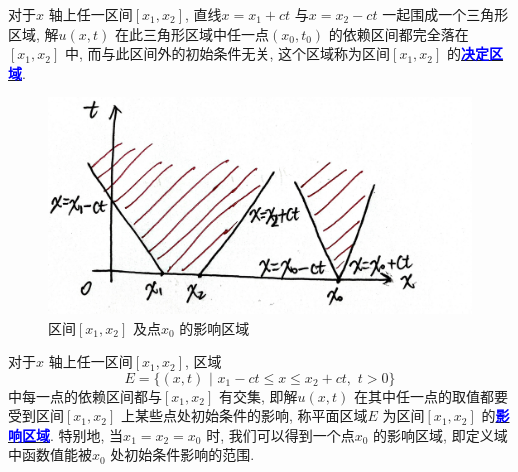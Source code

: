 \begin{thm}
\begin{rmk}
\begin{defn}
				\hspace*{-1.85em}对于$x$ 轴上任一区间$[x_1 , x_2]$, 直线$x = x_1 + ct$ 与$x = x_2 - ct$ 一起围成一个三角形区域, 解$u(x , t)$ 在此三角形区域中任一点$(x_0 , t_0)$ 的依赖区间都完全落在$[x_1 , x_2]$ 中, 而与此区间外的初始条件无关, 这个区域称为区间$[x_1 , x_2]$ 的\underline{\textcolor{blue}{\textbf{决定区域}}}. 
				
				\vspace*{4em}
				
				\begin{figure}[thbp!]
					\centering
					\includegraphics[width=0.5\linewidth]{figure/2.3-3}
					\caption{区间$[x_1 , x_2]$ 及点$x_0$ 的影响区域}
					\label{pic : 2.3-3} %
				\end{figure}
			
				\vspace*{4em}
				
				\hspace*{-1.85em}对于$x$ 轴上任一区间$[x_1 , x_2]$, 区域
				\[ E = \Big\{ (x , t) \,\, \Big| \,\, x_1 - ct \leq x \leq x_2 + ct , \,\, t > 0 \Big\} \]
				中每一点的依赖区间都与$[x_1 , x_2]$ 有交集, 即解$u(x , t)$ 在其中任一点的取值都要受到区间$[x_1 , x_2]$ 上某些点处初始条件的影响, 称平面区域$E$ 为区间$[x_1 , x_2]$ 的\underline{\textcolor{blue}{\textbf{影响区域}}}. 特别地, 当$x_1 = x_2 = x_0$ 时, 我们可以得到一个点$x_0$ 的影响区域, 即定义域中函数值能被$x_0$ 处初始条件影响的范围. 
				
				
			\end{defn}
		\end{rmk}
		
		\vspace*{10em}
		

\end{thm}
